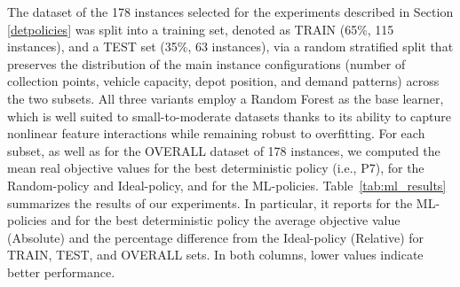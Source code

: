 \documentclass[preprint,11pt,authoryear]{elsarticle}
\newcommand{\sm}[1]{\textcolor{orange}{{#1}}}
\begin{document}
The dataset of the 178 instances selected for the experiments described in Section \ref{detpolicies} was split into a training set, denoted as TRAIN (65\%, 115 instances), and a TEST set (35\%, 63 instances), via a random stratified split that preserves the distribution of the main instance configurations (number of collection points, vehicle capacity, depot position, and demand patterns) across the two subsets.
All three variants employ a Random Forest as the base learner, which is well suited to small-to-moderate datasets thanks to its ability to capture nonlinear feature interactions while remaining robust to overfitting.
For each subset, as well as for the OVERALL dataset of 178 instances, we computed the mean real objective values for the best deterministic policy (i.e., P7), for the Random-policy and Ideal-policy, and for the ML-policies. Table~\ref{tab:ml_results} summarizes the results of our experiments. In particular, it reports for the ML-policies and for the best deterministic policy the average objective value (Absolute) and the percentage difference from the Ideal-policy (Relative) for TRAIN, TEST, and OVERALL sets. In both columns, lower values indicate better performance.  
\end{document}
